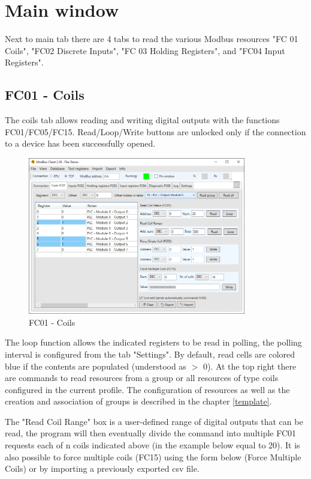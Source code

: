 
\chapter{Main window}

Next to main tab there are 4 tabs to read the various Modbus resources 
"FC 01 Coils", "FC02 Discrete Inputs", "FC 03 Holding Registers", and "FC04 Input Registers".

\section{FC01 - Coils}

The coils tab allows reading and writing digital outputs with the functions FC01/FC05/FC15.
Read/Loop/Write buttons are unlocked only if the connection to a device has been successfully
opened.

\begin{figure}[H]
\centering
\includegraphics[width=0.85\textwidth]{../Img/Modbus_Client_Coils_00.PNG}
\caption{FC01 - Coils}
\end{figure}

The loop function allows the indicated registers to be read in polling, the polling interval is
configured from the tab "Settings". 
By default, read cells are colored blue if the contents are populated (understood as $>$ 0).
At the top right there are commands to read resources from a group or all resources
of type coils configured in the current profile. The configuration of resources as well as the creation and 
association of groups is described in the chapter \ref{template}.

\newpage

The "Read Coil Range" box is a user-defined range of digital outputs that can be read,
the program will then eventually divide the command into multiple FC01 requests each of n coils
indicated above (in the example below equal to 20). 
It is also possible to force multiple coils (FC15) using the form below 
(Force Multiple Coils) or by importing a previously exported csv file.

